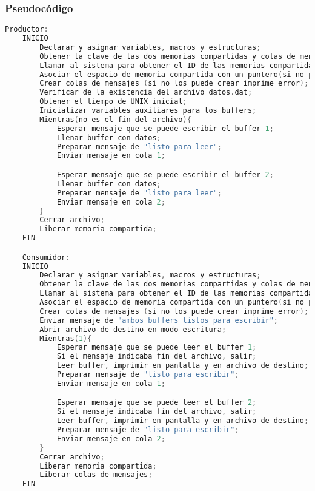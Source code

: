 \subsubsection{Pseudocódigo}

\begin{lstlisting}[language=C]          % No usar tildes en el pseudocódigo
    Productor:
    INICIO
        Declarar y asignar variables, macros y estructuras;
        Obtener la clave de las dos memorias compartidas y colas de mensaje (en el caso de que no las obtenga imprime error);
        Llamar al sistema para obtener el ID de las memorias compartidas (en el caso de que no las obtenga imprime error);
        Asociar el espacio de memoria compartida con un puntero(si no puede asociar imprime error);
        Crear colas de mensajes (si no los puede crear imprime error);
        Verificar de la existencia del archivo datos.dat;
        Obtener el tiempo de UNIX inicial;
        Inicializar variables auxiliares para los buffers;
        Mientras(no es el fin del archivo){
            Esperar mensaje que se puede escribir el buffer 1;
            Llenar buffer con datos;
            Preparar mensaje de "listo para leer";
            Enviar mensaje en cola 1;

            Esperar mensaje que se puede escribir el buffer 2;
            Llenar buffer con datos;
            Preparar mensaje de "listo para leer";
            Enviar mensaje en cola 2;
        }
        Cerrar archivo;
        Liberar memoria compartida;
    FIN

    Consumidor:
    INICIO
        Declarar y asignar variables, macros y estructuras;
        Obtener la clave de las dos memorias compartidas y colas de mensaje (en el caso de que no las obtenga imprime error);
        Llamar al sistema para obtener el ID de las memorias compartidas (en el caso de que no las obtenga imprime error);
        Asociar el espacio de memoria compartida con un puntero(si no puede asociar imprime error);
        Crear colas de mensajes (si no los puede crear imprime error);
        Enviar mensaje de "ambos buffers listos para escribir";
        Abrir archivo de destino en modo escritura;
        Mientras(1){
            Esperar mensaje que se puede leer el buffer 1;
            Si el mensaje indicaba fin del archivo, salir;
            Leer buffer, imprimir en pantalla y en archivo de destino;
            Preparar mensaje de "listo para escribir";
            Enviar mensaje en cola 1;

            Esperar mensaje que se puede leer el buffer 2;
            Si el mensaje indicaba fin del archivo, salir;
            Leer buffer, imprimir en pantalla y en archivo de destino;
            Preparar mensaje de "listo para escribir";
            Enviar mensaje en cola 2;
        }
        Cerrar archivo;
        Liberar memoria compartida;
        Liberar colas de mensajes;
    FIN
    
\end{lstlisting}

